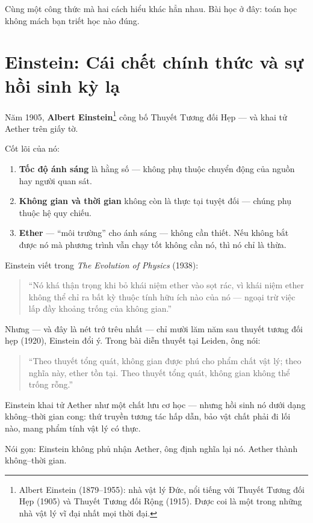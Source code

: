 Cùng một công thức mà hai cách hiểu khác hẳn nhau. Bài học ở đây: toán học không mách bạn triết học nào đúng.


\section{Einstein: Cái chết chính thức và sự hồi sinh kỳ lạ}

Năm 1905, \textbf{Albert Einstein}\footnote{Albert Einstein (1879--1955): nhà vật lý Đức, nổi tiếng với Thuyết Tương đối Hẹp (1905) và Thuyết Tương đối Rộng (1915). Được coi là một trong những nhà vật lý vĩ đại nhất mọi thời đại.} công bố Thuyết Tương đối Hẹp — và khai tử Aether trên giấy tờ.

Cốt lõi của nó:

\begin{enumerate}
  \item \textbf{Tốc độ ánh sáng} là hằng số — không phụ thuộc chuyển động của nguồn hay người quan sát.
  \item \textbf{Không gian và thời gian} không còn là thực tại tuyệt đối — chúng phụ thuộc hệ quy chiếu.
  \item \textbf{Ether} — “môi trường” cho ánh sáng — không cần thiết. Nếu không bắt được nó mà phương trình vẫn chạy tốt không cần nó, thì nó chỉ là thừa.
\end{enumerate}

Einstein viết trong \emph{The Evolution of Physics} (1938):

\begin{quote}
“Nó khá thận trọng khi bỏ khái niệm ether vào sọt rác, vì khái niệm ether không thể chỉ ra bất kỳ thuộc tính hữu ích nào của nó — ngoại trừ việc lấp đầy khoảng trống của không gian.”
\end{quote}

Nhưng — và đây là nét trớ trêu nhất — chỉ mười lăm năm sau thuyết tương đối hẹp (1920), Einstein đổi ý. Trong bài diễn thuyết tại Leiden, ông nói:

\begin{quote}
“Theo thuyết tổng quát, không gian được phú cho phẩm chất vật lý; theo nghĩa này, ether tồn tại. Theo thuyết tổng quát, không gian không thể trống rỗng.”
\end{quote}

Einstein khai tử Aether như một chất lưu cơ học — nhưng hồi sinh nó dưới dạng không--thời gian cong: thứ truyền tương tác hấp dẫn, bảo vật chất phải đi lối nào, mang phẩm tính vật lý có thực.

Nói gọn: Einstein không phủ nhận Aether, ông định nghĩa lại nó. Aether thành không--thời gian.


